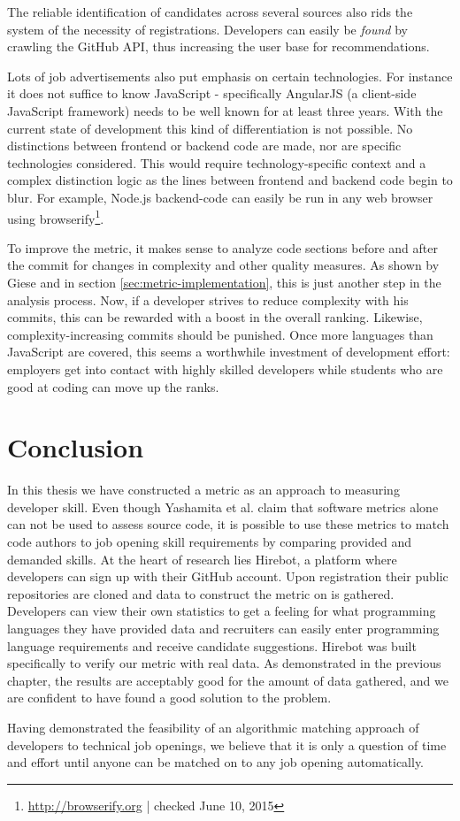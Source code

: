 The reliable identification of candidates across several sources also rids the system of the necessity of registrations. Developers can easily be \textit{found} by crawling the GitHub API, thus increasing the user base for recommendations.


Lots of job advertisements also put emphasis on certain technologies. For instance it does not suffice to know JavaScript - specifically AngularJS (a client-side JavaScript framework) needs to be well known for at least three years. With the current state of development this kind of differentiation is not possible. No distinctions between frontend or backend code are made, nor are specific technologies considered. This would require technology-specific context and a complex distinction logic as the lines between frontend and backend code begin to blur. For example, Node.js backend-code can easily be run in any web browser using browserify\footnote{\url{http://browserify.org} | checked June 10, 2015}.
\newline

To improve the metric, it makes sense to analyze code sections before and after the commit for changes in complexity and other quality measures. As shown by Giese \cite{pg:2014} and in section \ref{sec:metric-implementation}, this is just another step in the analysis process. Now, if a developer strives to reduce complexity with his commits, this can be rewarded with a boost in the overall ranking. Likewise, complexity-increasing commits should be punished. Once more languages than JavaScript are covered, this seems a worthwhile investment of development effort: employers get into contact with highly skilled developers while students who are good at coding can move up the ranks.

\section{Conclusion}
In this thesis we have constructed a metric as an approach to measuring developer skill. Even though Yashamita et al. claim that software metrics alone can not be used to assess source code\cite{mlya:2012}, it is possible to use these metrics to match code authors to job opening skill requirements by comparing provided and demanded skills. At the heart of research lies Hirebot, a platform where developers can sign up with their GitHub account. Upon registration their public repositories are cloned and data to construct the metric on is gathered. Developers can view their own statistics to get a feeling for what programming languages they have provided data and recruiters can easily enter programming language requirements and receive candidate suggestions. Hirebot was built specifically to verify our metric with real data. As demonstrated in the previous chapter, the results are acceptably good for the amount of data gathered, and we are confident to have found a good solution to the problem.

Having demonstrated the feasibility of an algorithmic matching approach of developers to technical job openings, we believe that it is only a question of time and effort until anyone can be matched on to any job opening automatically.

